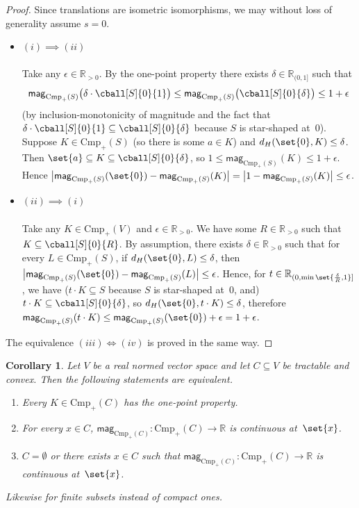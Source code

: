 \documentclass[11pt]{article}
\theoremstyle{plain}
\newtheorem{corollary}[theorem]{Corollary}
\theoremstyle{definition}
\newcommand{\proven}[1]{\underline{#1} \\ \ \vspace{-2ex} \\}
\newcommand{\RR}{\mathbb{R}}
\newcommand{\intoc}[3][\RR]{{#1}_{(#2, #3]}}
\newcommand{\mg}[1][]{\mathsf{mag}_{#1}}
\newcommand{\csub}{\mathrm{Cmp}}
\newcommand{\icsub}{\csub_{+}}
\begin{document}
\begin{proof}
Since translations are isometric isomorphisms, we may without loss of generality assume $s = 0$.
\begin{itemize}
\item\proven{$(i) \implies (ii)$}
Take any $\epsilon \in \RR_{> 0}$. By the one-point property there exists $\delta \in \intoc{0}{1}$ such that
\[\mg[\icsub(S)]\big(\delta \cdot \cball[S]{0}{1}\big) \leq \mg[\icsub(S)]\big(\cball[S]{0}{\delta}\big) \leq 1 + \epsilon\]
(by inclusion-monotonicity of magnitude and the fact that $\delta \cdot \cball[S]{0}{1} \subseteq \cball[S]{0}{\delta}$ because $S$ is star-shaped at~$0$). Suppose $K \in \icsub(S)$ (so there is some $a \in K$) and $d_H(\set{0}, K) \leq \delta$. Then $\set{a} \subseteq K \subseteq \cball[S]{0}{\delta}$, so $1 \leq \mg[\icsub(S)](K) \leq 1 + \epsilon$. Hence $\big|\mg[\icsub(S)](\set{0}) - \mg[\icsub(S)](K)\big| = \big|1 - \mg[\icsub(S)](K)\big| \leq \epsilon$.
\item\proven{$(ii) \implies (i)$}
Take any $K \in \icsub(V)$ and $\epsilon \in \RR_{> 0}$. We have some $R \in \RR_{> 0}$ such that $K \subseteq \cball[S]{0}{R}$. By assumption, there exists $\delta \in \RR_{> 0}$ such that for every $L \in \icsub(S)$, if $d_H(\set{0}, L) \leq \delta$, then $\big|\mg[\icsub(S)](\set{0}) - \mg[\icsub(S)](L)\big| \leq \epsilon$. Hence, for $t \in \intoc{0}{\min\set{\frac{\delta}{R}, 1}}$, we have ($t \cdot K \subseteq S$ because $S$ is star-shaped at~$0$, and) $t \cdot K \subseteq \cball[S]{0}{\delta}$, so $d_H(\set{0}, t \cdot K) \leq \delta$, therefore $\mg[\icsub(S)](t \cdot K) \leq \mg[\icsub(S)](\set{0}) + \epsilon = 1 + \epsilon$.
\end{itemize}
The equivalence $(iii) \iff (iv)$ is proved in the same way.
\end{proof}

\begin{corollary}\label{corollary:one-point-property-is-singleton-magnitude-continuity}
Let $V$ be a real normed vector space and let $C \subseteq V$ be tractable and convex. Then the following statements are equivalent.
\begin{enumerate}[label=(\roman*)]
\item
Every $K \in \icsub(C)$ has the one-point property.
\item
For every $x \in C$, $\mg[\icsub(C)]\colon \icsub(C) \to \RR$ is continuous at~$\set{x}$.
\item
$C = \emptyset$ or there exists $x \in C$ such that $\mg[\icsub(C)]\colon \icsub(C) \to \RR$ is continuous at~$\set{x}$.
\end{enumerate}
Likewise for finite subsets instead of compact ones.
\end{corollary}
\end{document}
